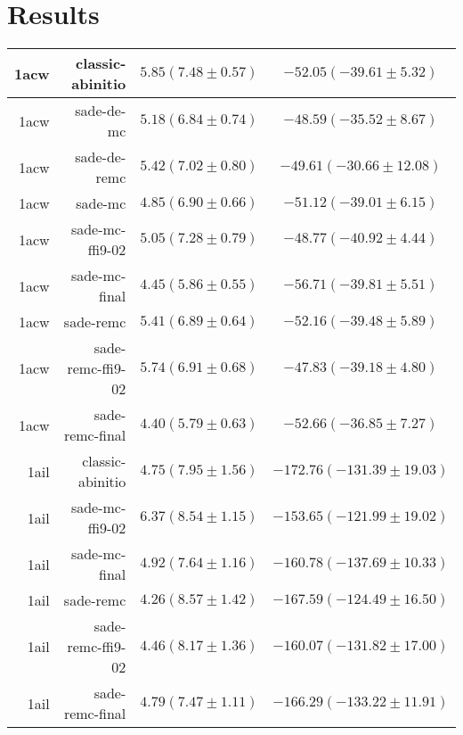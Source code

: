 \chapter{Results}\label{appendix:table-results}

\begin{table}
    \centering
    \begin{tabular}{r|r|c|c}
        \hline
        1acw &   classic-abinitio & $5.85 (  7.48 \pm   0.57)$ & $-52.05 (-39.61 \pm   5.32)$ \\ \hline
        1acw &         sade-de-mc & $5.18 (  6.84 \pm   0.74)$ & $-48.59 (-35.52 \pm   8.67)$ \\ \hline
        1acw &       sade-de-remc & $5.42 (  7.02 \pm   0.80)$ & $-49.61 (-30.66 \pm  12.08)$ \\ \hline
        1acw &            sade-mc & $4.85 (  6.90 \pm   0.66)$ & $-51.12 (-39.01 \pm   6.15)$ \\ \hline
        1acw &    sade-mc-ffi9-02 & $5.05 (  7.28 \pm   0.79)$ & $-48.77 (-40.92 \pm   4.44)$ \\ \hline
        1acw &      sade-mc-final & $4.45 (  5.86 \pm   0.55)$ & $-56.71 (-39.81 \pm   5.51)$ \\ \hline
        1acw &          sade-remc & $5.41 (  6.89 \pm   0.64)$ & $-52.16 (-39.48 \pm   5.89)$ \\ \hline
        1acw &  sade-remc-ffi9-02 & $5.74 (  6.91 \pm   0.68)$ & $-47.83 (-39.18 \pm   4.80)$ \\ \hline
        1acw &    sade-remc-final & $4.40 (  5.79 \pm   0.63)$ & $-52.66 (-36.85 \pm   7.27)$ \\ \hline
        \hline
        1ail &   classic-abinitio & $4.75 (  7.95 \pm   1.56)$ & $-172.76 (-131.39 \pm  19.03)$ \\ \hline
        1ail &    sade-mc-ffi9-02 & $6.37 (  8.54 \pm   1.15)$ & $-153.65 (-121.99 \pm  19.02)$ \\ \hline
        1ail &      sade-mc-final & $4.92 (  7.64 \pm   1.16)$ & $-160.78 (-137.69 \pm  10.33)$ \\ \hline
        1ail &          sade-remc & $4.26 (  8.57 \pm   1.42)$ & $-167.59 (-124.49 \pm  16.50)$ \\ \hline
        1ail &  sade-remc-ffi9-02 & $4.46 (  8.17 \pm   1.36)$ & $-160.07 (-131.82 \pm  17.00)$ \\ \hline
        1ail &    sade-remc-final & $4.79 (  7.47 \pm   1.11)$ & $-166.29 (-133.22 \pm  11.91)$ \\ \hline
        \hline

\end{tabular}
\end{table}
